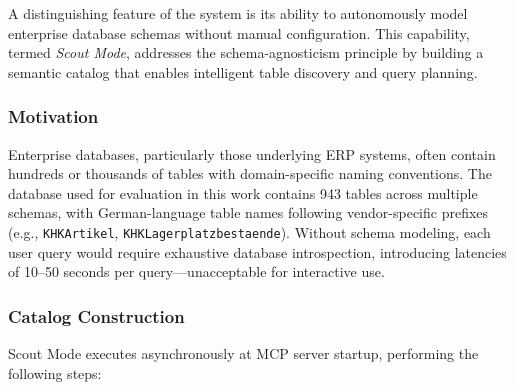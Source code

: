 A distinguishing feature of the system is its ability to autonomously model enterprise database schemas without manual configuration. This capability, termed \emph{Scout Mode}, addresses the schema-agnosticism principle by building a semantic catalog that enables intelligent table discovery and query planning.

\subsubsection{Motivation}

Enterprise databases, particularly those underlying ERP systems, often contain hundreds or thousands of tables with domain-specific naming conventions. The database used for evaluation in this work contains 943 tables across multiple schemas, with German-language table names following vendor-specific prefixes (e.g., \texttt{KHKArtikel}, \texttt{KHKLagerplatzbestaende}). Without schema modeling, each user query would require exhaustive database introspection, introducing latencies of 10--50 seconds per query---unacceptable for interactive use.

\subsubsection{Catalog Construction}

Scout Mode executes asynchronously at MCP server startup, performing the following steps:

